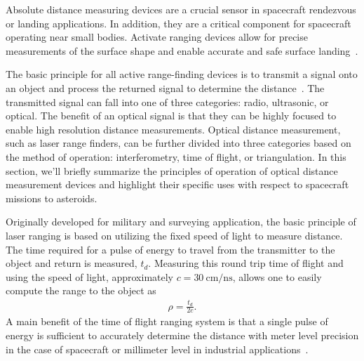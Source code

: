 \documentclass[letterpaper, paper,11pt]{AAS}		%
\begin{document}
Absolute distance measuring devices are a crucial sensor in spacecraft rendezvous or landing applications.
In addition, they are a critical component for spacecraft operating near small bodies.
Activate ranging devices allow for precise measurements of the surface shape and enable accurate and safe surface landing~\cite{berry2013}.

The basic principle for all active range-finding devices is to transmit a signal onto an object and process the returned signal to determine the distance~\cite{amann2001}.
The transmitted signal can fall into one of three categories: radio, ultrasonic, or optical.
The benefit of an optical signal is that they can be highly focused to enable high resolution distance measurements.
Optical distance measurement, such as laser range finders, can be further divided into three categories based on the method of operation: interferometry, time of flight, or triangulation.
In this section, we'll briefly summarize the principles of operation of optical distance measurement devices and highlight their specific uses with respect to spacecraft missions to asteroids.

Originally developed for military and surveying application, the basic principle of laser ranging is based on utilizing the fixed speed of light to measure distance.
The time required for a pulse of energy to travel from the transmitter to the object and return is measured, \( t_d \). 
Measuring this round trip time of flight and using the speed of light, approximately \( c = \SI{30}{\centi\meter\per\nano\second}\), allows one to easily compute the range to the object as
\begin{align}
    \rho = \frac{t_d}{2 c}. 
\end{align}
A main benefit of the time of flight ranging system is that a single pulse of energy is sufficient to accurately determine the distance with meter level precision in the case of spacecraft or millimeter level in industrial applications~\cite{zuber1997,cole1998,amann2001}.
\end{document}
